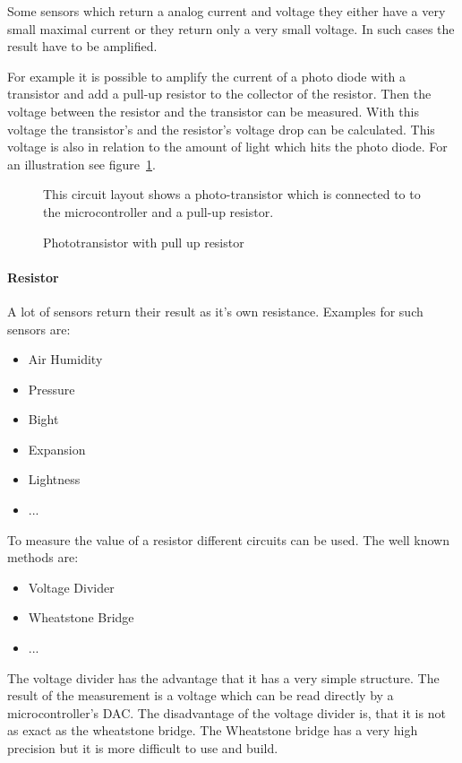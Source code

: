 Some sensors which return a analog current and voltage they either have a very small maximal current or they return only a very small voltage. In such cases the result have to be amplified.

For example it is possible to amplify the current of a photo diode with a transistor and add a pull-up resistor to the collector of the resistor.
Then the voltage between the resistor and the transistor can be measured. With this voltage the transistor's and the resistor's voltage drop can be calculated. This voltage is also in relation to the amount of light which hits the photo diode.
For an illustration see figure~\ref{fig:phototransistorWithPullUp}.


\begin{figure}

\caption{Phototransistor with pull up resistor}
\medskip
\small
This circuit layout shows a photo-transistor which is connected to to the microcontroller and a pull-up resistor.
\label{fig:phototransistorWithPullUp}
\end{figure}



\paragraph{Resistor}
A lot of sensors return their result as it's own resistance.
Examples for such sensors are:
\begin{itemize}
\item Air Humidity
\item Pressure
\item Bight
\item Expansion
\item Lightness
\item ...
\end{itemize}
To measure the value of a resistor different circuits can be used.
The well known methods are:
\begin{itemize}
\item Voltage Divider
\item Wheatstone Bridge
\item ...
\end{itemize}
The voltage divider has the advantage that it has a very simple structure.
The result of the measurement is a voltage which can be read directly by a microcontroller's DAC.
The disadvantage of the voltage divider is, that it is not as exact as the wheatstone bridge.
The Wheatstone bridge has a very high precision but it is more difficult to use and build.


